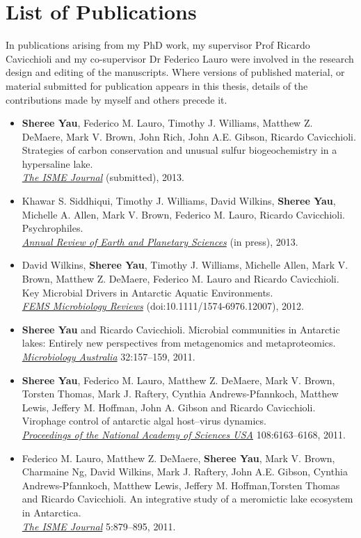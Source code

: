 \chapter*{List of Publications}
In publications arising from my PhD work, my supervisor Prof Ricardo Cavicchioli and my co-supervisor Dr Federico Lauro were
involved in the research design and editing of the manuscripts.
Where versions of published material, or material submitted for publication appears in this thesis, details of the contributions made by myself and others precede it.

\begin{itemize}

\item \textbf{Sheree Yau}, Federico M. Lauro, Timothy J. Williams, Matthew Z. DeMaere, Mark V. Brown, John Rich, John A.E. Gibson, Ricardo Cavicchioli. 
Strategies of carbon conservation and unusual sulfur biogeochemistry in a hypersaline lake. \\
\emph{\underline{The ISME Journal}}
(submitted), 2013.

\item Khawar S. Siddhiqui, Timothy J. Williams, David Wilkins, \textbf{Sheree Yau}, Michelle A. Allen, Mark V. Brown, Federico M. Lauro, Ricardo Cavicchioli.
Psychrophiles.\\
\emph{\underline{Annual Review of Earth and Planetary Sciences}}
(in press), 2013.

\item David Wilkins, \textbf{Sheree Yau}, Timothy J. Williams, Michelle Allen, Mark V. Brown, Matthew Z. DeMaere, Federico M. Lauro and Ricardo Cavicchioli.
Key Microbial Drivers in Antarctic Aquatic Environments.\\
\emph{\underline{FEMS Microbiology Reviews}} 
(doi:10.1111/1574-6976.12007), 2012.

\item \textbf{Sheree Yau} and Ricardo Cavicchioli. 
Microbial communities in Antarctic lakes: Entirely new perspectives from metagenomics and metaproteomics. \\
\emph{\underline{Microbiology Australia}} 32:157--159, 2011.

\item \textbf{Sheree Yau}, Federico M. Lauro, Matthew Z. DeMaere, Mark V. Brown, Torsten Thomas, 
Mark J. Raftery, Cynthia Andrews-Pfannkoch, Matthew Lewis, Jeffery M. Hoffman, John A. Gibson and 
Ricardo Cavicchioli. 
Virophage control of antarctic algal host--virus dynamics. \\
\emph{\underline{Proceedings of the National Academy of Sciences USA}}
108:6163--6168, 2011.

\item Federico M. Lauro, Matthew Z. DeMaere, \textbf{Sheree Yau}, Mark V. Brown, Charmaine Ng, David Wilkins, Mark J. Raftery, John A.E. Gibson, Cynthia Andrews-Pfannkoch, Matthew Lewis, Jeffery M. Hoffman,Torsten Thomas and Ricardo Cavicchioli. 
An integrative study of a meromictic lake ecosystem in Antarctica. \\
\emph{\underline{The ISME Journal}}
5:879--895, 2011.

\end{itemize}


